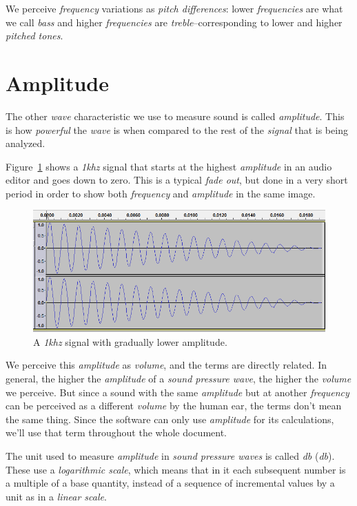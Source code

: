 \documentclass[10pt,a4paper]{report}
\newcommand{\define}[1]{\textit{\acrlong{#1}} (\textit{\acrshort{#1}})}
\newcommand{\khz}[1]{\textit{\mbox{#1\acrshort{khz}}}}
\begin{document}
We perceive \textit{frequency} variations as \textit{pitch differences}: lower \textit{frequencies} are what we call \textit{bass} and higher \textit{frequencies} are \textit{treble}--corresponding to lower and higher \textit{pitched tones}.

\section{Amplitude}

The other \textit{wave} characteristic we use to measure sound is called \textit{amplitude}. This is how \textit{powerful} the \textit{wave} is when compared to the rest of the \textit{signal} that is being analyzed. 

Figure~\ref{fig:amplitude} shows a \khz{1} signal that starts at the highest \textit{amplitude} in an audio editor and goes down to zero. This is a typical \textit{fade out}, but done in a very short period in order to show both \textit{frequency} and \textit{amplitude} in the same image.

\begin{figure}[H]
	\centering
	\includegraphics[width=0.8\linewidth]{images/audio/amplitude.png}
	\caption[amplitude]{A \khz{1} signal with gradually lower amplitude.}
	\label{fig:amplitude}
\end{figure}

We perceive this \textit{amplitude} as \textit{volume}, and the terms are directly related. In general, the higher the \textit{amplitude} of a \textit{sound pressure wave}, the higher the \textit{volume} we perceive. But since a sound with the same  \textit{amplitude} but at another \textit{frequency} can be perceived as a different \textit{volume} by the human ear, the terms don't mean the same thing. Since the software can only use \textit{amplitude} for its calculations, we'll use that term throughout the whole document.

The unit used to measure \textit{amplitude} in \textit{sound pressure waves} is called \define{db}. These use a \textit{logarithmic scale}, which means that in it each subsequent number is a multiple of a base quantity, instead of a sequence of incremental values by a unit as in a \textit{linear scale}. 
\end{document}
